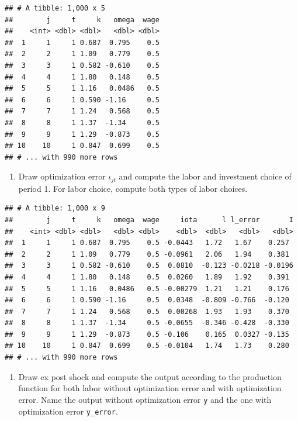 \documentclass[]{book}
\providecommand{\tightlist}{%
  \setlength{\itemsep}{0pt}\setlength{\parskip}{0pt}}
\begin{document}
\begin{verbatim}
## # A tibble: 1,000 x 5
##        j     t     k   omega  wage
##    <int> <dbl> <dbl>   <dbl> <dbl>
##  1     1     1 0.687  0.795    0.5
##  2     2     1 1.09   0.779    0.5
##  3     3     1 0.582 -0.610    0.5
##  4     4     1 1.80   0.148    0.5
##  5     5     1 1.16   0.0486   0.5
##  6     6     1 0.590 -1.16     0.5
##  7     7     1 1.24   0.568    0.5
##  8     8     1 1.37  -1.34     0.5
##  9     9     1 1.29  -0.873    0.5
## 10    10     1 0.847  0.699    0.5
## # ... with 990 more rows
\end{verbatim}

\begin{enumerate}
\def\labelenumi{\arabic{enumi}.}
\setcounter{enumi}{6}
\tightlist
\item
  Draw optimization error \(\iota_{jt}\) and compute the labor and
  investment choice of period 1. For labor choice, compute both types of
  labor choices.
\end{enumerate}

\begin{verbatim}
## # A tibble: 1,000 x 9
##        j     t     k   omega  wage     iota      l l_error       I
##    <int> <dbl> <dbl>   <dbl> <dbl>    <dbl>  <dbl>   <dbl>   <dbl>
##  1     1     1 0.687  0.795    0.5 -0.0443   1.72   1.67    0.257 
##  2     2     1 1.09   0.779    0.5 -0.0961   2.06   1.94    0.381 
##  3     3     1 0.582 -0.610    0.5  0.0810  -0.123 -0.0218 -0.0196
##  4     4     1 1.80   0.148    0.5  0.0260   1.89   1.92    0.391 
##  5     5     1 1.16   0.0486   0.5 -0.00279  1.21   1.21    0.176 
##  6     6     1 0.590 -1.16     0.5  0.0348  -0.809 -0.766  -0.120 
##  7     7     1 1.24   0.568    0.5  0.00268  1.93   1.93    0.370 
##  8     8     1 1.37  -1.34     0.5 -0.0655  -0.346 -0.428  -0.330 
##  9     9     1 1.29  -0.873    0.5 -0.106    0.165  0.0327 -0.135 
## 10    10     1 0.847  0.699    0.5 -0.0104   1.74   1.73    0.280 
## # ... with 990 more rows
\end{verbatim}

\begin{enumerate}
\def\labelenumi{\arabic{enumi}.}
\setcounter{enumi}{7}
\tightlist
\item
  Draw ex post shock and compute the output according to the production
  function for both labor without optimization error and with
  optimization error. Name the output without optimization error
  \texttt{y} and the one with optimization error \texttt{y\_error}.
\end{enumerate}
\end{document}
